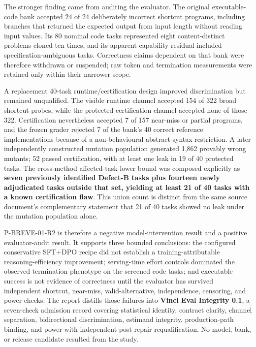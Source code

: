 \documentclass[
]{article}
\newcounter{none} %
\begin{document}
The stronger finding came from auditing the evaluator. The original
executable-code bank accepted 24 of 24 deliberately incorrect shortcut
programs, including branches that returned the expected output from
input length without reading input values. Its 80 nominal code tasks
represented eight content-distinct problems cloned ten times, and its
apparent capability residual included specification-ambiguous tasks.
Correctness claims dependent on that bank were therefore withdrawn or
suspended; raw token and termination measurements were retained only
within their narrower scope.

A replacement 40-task runtime/certification design improved
discrimination but remained unqualified. The visible runtime channel
accepted 154 of 322 broad shortcut probes, while the protected
certification channel accepted none of those 322. Certification
nevertheless accepted 7 of 157 near-miss or partial programs, and the
frozen grader rejected 7 of the bank's 40 correct reference
implementations because of a non-behavioural abstract-syntax
restriction. A later independently constructed mutation population
generated 1,862 provably wrong mutants; 52 passed certification, with at
least one leak in 19 of 40 protected tasks. The cross-method
affected-task lower bound was composed explicitly as \textbf{seven
previously identified Defect-B tasks plus fourteen newly adjudicated
tasks outside that set, yielding at least 21 of 40 tasks with a known
certification flaw}. This union count is distinct from the same source
document's complementary statement that 21 of 40 tasks showed no leak
under the mutation population alone.

P-BREVE-01-R2 is therefore a negative model-intervention result and a
positive evaluator-audit result. It supports three bounded conclusions:
the configured conservative SFT+DPO recipe did not establish a
training-attributable reasoning-efficiency improvement; serving-time
effort controls dominated the observed termination phenotype on the
screened code tasks; and executable success is not evidence of
correctness until the evaluator has survived independent shortcut,
near-miss, valid-alternative, independence, censoring, and power checks.
The report distills those failures into \textbf{Vinci Eval Integrity
0.1}, a seven-check admission record covering statistical identity,
contract clarity, channel separation, bidirectional discrimination,
estimand integrity, production-path binding, and power with independent
post-repair requalification. No model, bank, or release candidate
resulted from the study.
\end{document}
